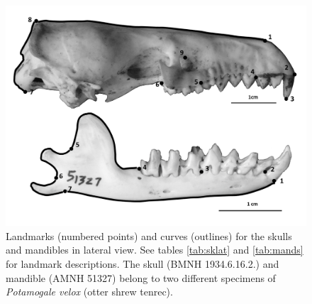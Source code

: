 \begin{figure}[!htbp]
	\centering
	\includegraphics[width=1\linewidth]{Methods/figures/Sklat+mands_combined_BW.png}
	\caption[Lateral skulls and mandibles landmarks]
	{Landmarks (numbered points) and curves (outlines) for the skulls and mandibles in lateral view. See tables \ref{tab:sklat} and \ref{tab:mands} for landmark descriptions. The skull (BMNH 1934.6.16.2.) and mandible (AMNH 51327) belong to two different specimens of \textit{Potamogale velox} (otter shrew tenrec).}
	\label{fig:sklat_mands}
\end{figure}

\begin{table}[!htb]
\caption[Skulls: lateral landmarks]
		{Descriptions of the landmarks (points) and curves (semilandmarks) for the skulls in lateral view (Figure \ref{fig:sklat_mands}).} 

\label{tab:sklat}
\end{table}

\begin{table}[!htb]			
	\centering
	\caption[Mandibles: landmarks]
		{Descriptions of the landmarks (points) and curves (semilandmarks) for the mandibles in lateral (buccal) view (Figure \ref{fig:sklat_mands}).}
	
	\label{tab:mands} 
\end{table}


\newpage
\subsection{}
\label{sect:procrustes}

